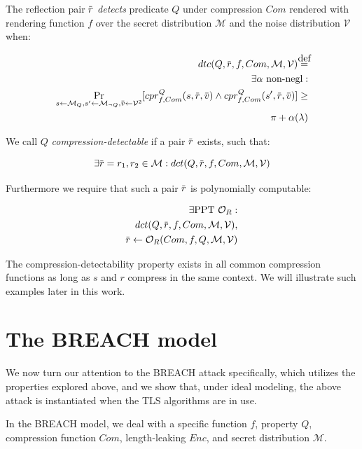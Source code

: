 \documentclass{sig-alternate-05-2015}
\newcommand\defeq{\stackrel{\mathclap{\normalfont\mbox{def}}}{=}}
\newcommand{\overbar}[1]{\mkern 1.5mu\overline{\mkern-1.5mu#1\mkern-1.5mu}\mkern 1.5mu}
\begin{document}
The reflection pair $\overbar{r}$ \textit{detects} predicate $Q$ under
compression $Com$ rendered with rendering function $f$ over the secret
distribution $\mathcal{M}$ and the noise distribution $\mathcal{V}$ when:

\begin{align*}
    dtc(Q, \overbar{r}, f, Com, \mathcal{M}, \mathcal{V})
    \defeq\\
    \exists \alpha \text{ non-negl}:\\
    \Pr_{s \leftarrow \mathcal{M}_Q,
        s' \leftarrow \mathcal{M}_{\lnot Q},
        \overbar{v} \leftarrow \mathcal{V}^2}
        [cpr^Q_{f, Com}(s, \overbar{r}, \overbar{v}) \land
         cpr^Q_{f, Com}(s', \overbar{r}, \overbar{v})]
    \geq\\
    \pi + \alpha(\lambda)
\end{align*}

We call $Q$ \textit{compression-detectable} if a pair $\overbar{r}$ exists,
such that:

\begin{equation*}
    \exists \overbar{r} = r_1, r_2 \in \mathcal{M}:
    dct(Q, \overbar{r}, f, Com, \mathcal{M}, \mathcal{V})
\end{equation*}

Furthermore we require that such a pair $\overbar{r}$ is polynomially
computable:

\begin{align*}
    \exists \text{PPT } \mathcal{O}_R:\\
    dct(Q, \overbar{r}, f, Com, \mathcal{M}, \mathcal{V}),\\
    \overbar{r} \leftarrow \mathcal{O}_R(Com, f, Q, \mathcal{M}, \mathcal{V})
\end{align*}

The compression-detectability property exists in all common compression
functions as long as $s$ and $r$ compress in the same context. We will
illustrate such examples later in this work.

\section{The BREACH model}\label{sec:breachmodel}
We now turn our attention to the BREACH attack specifically, which utilizes
the properties explored above, and we show that, under ideal modeling,
the above attack is instantiated when the TLS algorithms are in use.

In the BREACH model, we deal with a specific function $f$, property $Q$,
compression function $Com$, length-leaking $Enc$, and secret distribution
$\mathcal{M}$.
\end{document}
